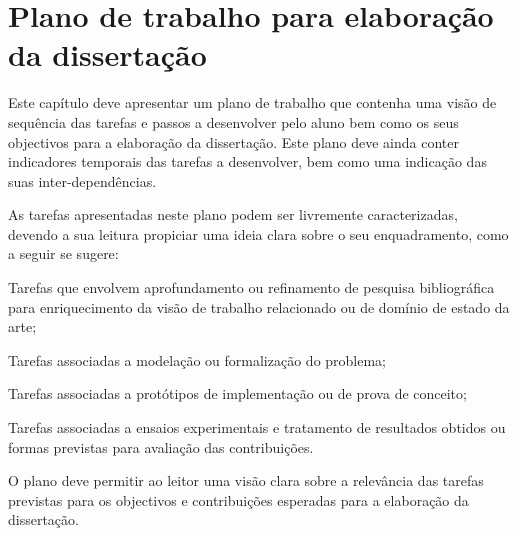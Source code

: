 \chapter[Plano de trabalho]{Plano de trabalho para elaboração da dissertação}
\label{cha:plano}

Este capítulo deve apresentar um plano de trabalho que contenha uma visão de sequência das tarefas e passos a desenvolver pelo aluno bem como os seus objectivos para a elaboração da dissertação. Este plano deve ainda conter indicadores temporais das tarefas a desenvolver, bem como uma indicação das suas inter-dependências.

As tarefas apresentadas neste plano podem ser livremente caracterizadas, devendo a sua leitura propiciar uma ideia clara sobre o seu enquadramento, como a seguir se sugere:

Tarefas que envolvem aprofundamento ou refinamento de pesquisa bibliográfica para enriquecimento da visão de trabalho relacionado ou de domínio de estado da arte;

Tarefas associadas a modelação ou formalização do problema;

Tarefas associadas a protótipos de implementação ou de prova de conceito;

Tarefas associadas a ensaios experimentais e tratamento de resultados obtidos ou formas previstas para avaliação das contribuições.

O plano deve permitir ao leitor uma visão clara sobre a relevância das tarefas previstas para os objectivos e contribuições esperadas para a elaboração da dissertação.
   